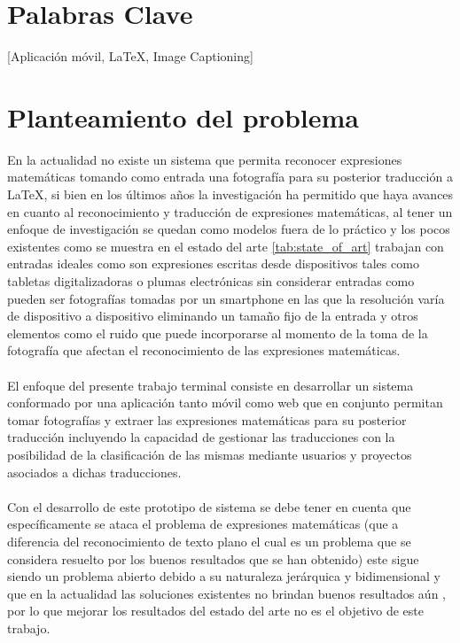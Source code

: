 \section{Palabras Clave}
[Aplicación móvil, LaTeX, Image Captioning] %
\newpage
\section{Planteamiento del problema}
En la actualidad no existe un sistema que permita reconocer expresiones matemáticas tomando como entrada una fotografía para su posterior traducción a \LaTeX, si bien en los últimos años la investigación ha permitido que haya avances en cuanto al reconocimiento y traducción de expresiones matemáticas, al tener un enfoque de investigación se quedan como modelos fuera de lo práctico y los pocos existentes como se muestra en el estado del arte \ref{tab:state_of_art} trabajan con entradas ideales como son expresiones escritas desde dispositivos tales como tabletas digitalizadoras o plumas electrónicas sin considerar entradas como pueden ser fotografías tomadas por un smartphone en las que la resolución varía de dispositivo a dispositivo eliminando un tamaño fijo de la entrada y otros elementos como el ruido que puede incorporarse al momento de la toma de la fotografía que afectan el reconocimiento de las expresiones matemáticas.
\\\\


El enfoque del presente trabajo terminal consiste en desarrollar un sistema conformado por una aplicación tanto móvil como web que en conjunto permitan tomar fotografías y extraer las expresiones matemáticas para su posterior traducción incluyendo la capacidad de gestionar las traducciones con la posibilidad de la clasificación de las mismas mediante usuarios y proyectos asociados a dichas traducciones.
\\\\%

Con el desarrollo de este prototipo de sistema se debe tener en cuenta que específicamente se ataca el problema de expresiones matemáticas (que a diferencia del reconocimiento de texto plano el cual es un problema que se considera resuelto por los buenos resultados que se han obtenido) este sigue siendo un problema abierto debido a su naturaleza jerárquica y bidimensional y que en la actualidad las soluciones existentes no brindan buenos resultados aún \cite{chino}, por lo que mejorar los resultados del estado del arte no es el objetivo de este trabajo.



